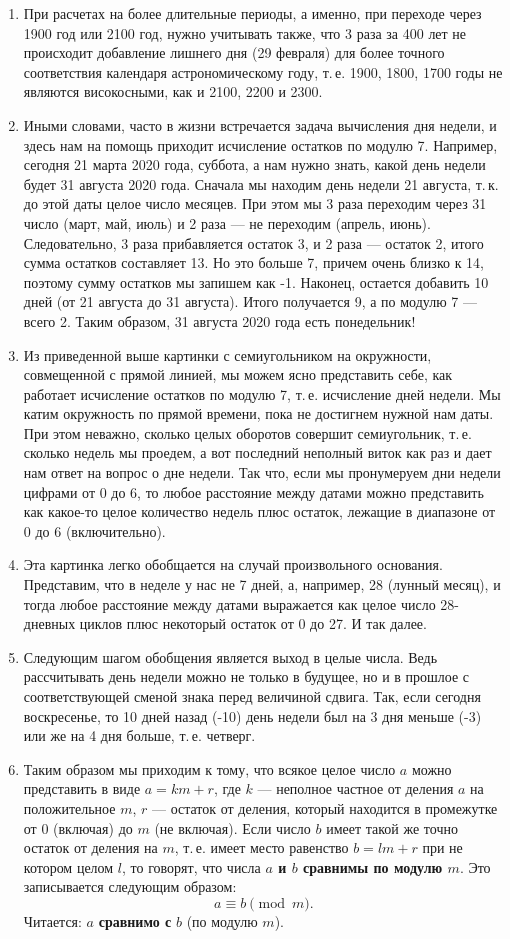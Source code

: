 \begin{enumerate}
\item При расчетах на более длительные периоды, а именно, при переходе через 1900 год или 2100 год, нужно учитывать также, что 3 раза за 400 лет не происходит добавление лишнего дня (29 февраля) для более точного соответствия календаря астрономическому году, т.\,е. 1900, 1800, 1700 годы не являются високосными, как и 2100, 2200 и 2300.
\item Иными словами, часто в жизни встречается задача вычисления дня недели, и здесь нам на помощь приходит исчисление остатков по модулю 7. Например, сегодня 21 марта 2020 года, суббота, а нам нужно знать, какой день недели будет 31 августа 2020 года. Сначала мы находим день недели 21 августа, т.\,к. до этой даты целое число месяцев. При этом мы 3 раза переходим через 31 число (март, май, июль) и 2 раза --- не переходим (апрель, июнь). Следовательно, 3 раза прибавляется остаток 3, и 2 раза --- остаток 2, итого сумма остатков составляет 13. Но это больше 7, причем очень близко к 14, поэтому сумму остатков мы запишем как -1. Наконец, остается добавить 10 дней (от 21 августа до 31 августа). Итого получается 9, а по модулю 7 --- всего 2. Таким образом, 31 августа 2020 года есть понедельник!
\item Из приведенной выше картинки с семиугольником на окружности, совмещенной с прямой линией, мы можем ясно представить себе, как работает исчисление остатков по модулю 7, т.\,е. исчисление дней недели. Мы катим окружность по прямой времени, пока не достигнем нужной нам даты. При этом неважно, сколько целых оборотов совершит семиугольник, т.\,е. сколько недель мы проедем, а вот последний неполный виток как раз и дает нам ответ на вопрос о дне недели. Так что, если мы пронумеруем дни недели цифрами от 0 до 6, то любое расстояние между датами можно представить как какое-то целое количество недель плюс остаток, лежащие в диапазоне от 0 до 6 (включительно).
\item Эта картинка легко обобщается на случай произвольного основания. Представим, что в неделе у нас не 7 дней, а, например, 28 (лунный месяц), и тогда любое расстояние между датами выражается как целое число 28-дневных циклов плюс некоторый остаток от 0 до 27. И так далее.
\item Следующим шагом обобщения является выход в целые числа. Ведь рассчитывать день недели можно не только в будущее, но и в прошлое с соответствующей сменой знака перед величиной сдвига. Так, если сегодня воскресенье, то 10 дней назад (-10) день недели был на 3 дня меньше (-3) или же на 4 дня больше, т.\,е. четверг.
\item Таким образом мы приходим к тому, что всякое целое число $a$ можно представить в виде $a=km+r$, где $k$ --- неполное частное от деления $a$ на положительное $m$, $r$ --- остаток от деления, который находится в промежутке от 0 (включая) до $m$ (не включая). Если число $b$ имеет такой же точно остаток от деления на $m$, т.\,е. имеет место равенство $b=lm+r$ при не котором целом $l$, то говорят, что числа \textbf{$a$ и $b$ сравнимы по модулю $m$}. Это записывается следующим образом:
$$
a\equiv b\pmod m.
$$
Читается: $a$ \textbf{сравнимо с} $b$ (по модулю $m$).


\end{enumerate}
